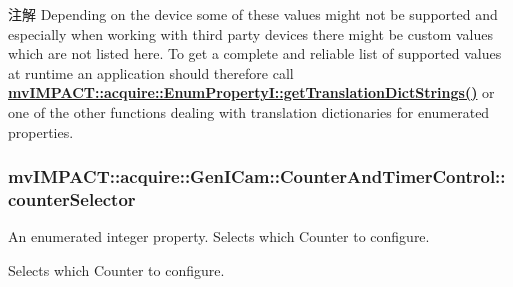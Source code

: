 \begin{DoxyNote}{注解}
Depending on the device some of these values might not be supported and especially when working with third party devices there might be custom values which are not listed here. To get a complete and reliable list of supported values at runtime an application should therefore call {\bfseries \hyperlink{classmv_i_m_p_a_c_t_1_1acquire_1_1_enum_property_i_a0ba6ccbf5ee69784d5d0b537924d26b6}{mv\+I\+M\+P\+A\+C\+T\+::acquire\+::\+Enum\+Property\+I\+::get\+Translation\+Dict\+Strings()}} or one of the other functions dealing with translation dictionaries for enumerated properties. 
\end{DoxyNote}
\hypertarget{classmv_i_m_p_a_c_t_1_1acquire_1_1_gen_i_cam_1_1_counter_and_timer_control_a2a8a3d52a70268d61a7f33ccedaa6c9c}{
\subsubsection[{counter\+Selector}]{ mv\+I\+M\+P\+A\+C\+T\+::acquire\+::\+Gen\+I\+Cam\+::\+Counter\+And\+Timer\+Control\+::counter\+Selector}}\label{classmv_i_m_p_a_c_t_1_1acquire_1_1_gen_i_cam_1_1_counter_and_timer_control_a2a8a3d52a70268d61a7f33ccedaa6c9c}


An enumerated integer property. Selects which Counter to configure. 

Selects which Counter to configure.


